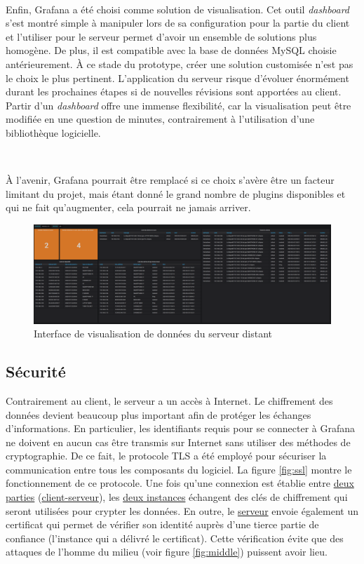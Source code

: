 ~

\noindent
Enfin, Grafana a été choisi comme solution de visualisation. Cet outil \textit{dashboard} s'est montré simple à manipuler lors de sa configuration pour la partie du client et l'utiliser pour le serveur permet d'avoir un ensemble de solutions plus homogène. De plus, il est compatible avec la base de données MySQL choisie antérieurement. À ce stade du prototype, créer une solution customisée n'est pas le choix le plus pertinent. L'application du serveur risque d'évoluer énormément durant les prochaines étapes si de nouvelles révisions sont apportées au client. Partir d'un \textit{dashboard} offre une immense flexibilité, car la visualisation peut être modifiée en une question de minutes, contrairement à l'utilisation d'une bibliothèque logicielle.

~

\noindent
À l'avenir, Grafana pourrait être remplacé si ce choix s'avère être un facteur limitant du projet, mais étant donné le grand nombre de plugins disponibles et qui ne fait qu'augmenter, cela pourrait ne jamais arriver.


\begin{figure}[ht!]
  \includegraphics[width=\textwidth]{img/app/grafana_server.png}
  \caption{Interface de visualisation de données du serveur distant}
  \label{fig:graf_server}
\end{figure}

\subsection{Sécurité}

\noindent
Contrairement au client, le serveur a un accès à Internet. Le chiffrement des données devient beaucoup plus important afin de protéger les échanges d'informations. En particulier, les identifiants requis pour se connecter à Grafana ne doivent en aucun cas être transmis sur Internet sans utiliser des méthodes de cryptographie. De ce fait, le protocole TLS a été employé pour sécuriser la communication entre tous les composants du logiciel. La figure \ref{fig:ssl} montre le fonctionnement de ce protocole. Une fois qu'une connexion est établie entre \underline{deux parties} (\underline{client-serveur}), les \underline{deux instances} échangent des clés de chiffrement qui seront utilisées pour crypter les données. En outre, le \underline{serveur} envoie également un certificat qui permet de vérifier son identité auprès d'une tierce partie de confiance (l'instance qui a délivré le certificat).  Cette vérification évite que des attaques de l'homme du milieu (voir figure \ref{fig:middle}) puissent avoir lieu.


